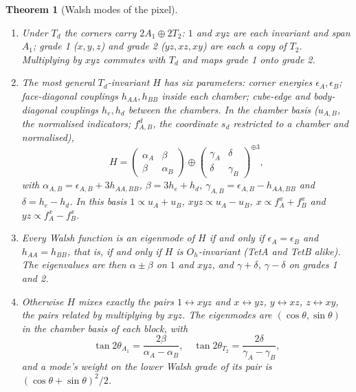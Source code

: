 \documentclass[twocolumn]{iopjournal}
\newtheorem{theorem}{Theorem}
\theoremstyle{definition}
\theoremstyle{remark}
\begin{document}
\begin{theorem}[Walsh modes of the pixel]
\label{thm:pairing}
\begin{enumerate}
\item[(i)] Under $T_d$ the corners carry $2A_1 \oplus 2T_2$: $1$ and
  $xyz$ are each invariant and span $A_1$; grade 1 ($x, y, z$) and grade 2
  ($yz, xz, xy$) are each a copy of $T_2$. Multiplying by $xyz$ commutes
  with $T_d$ and maps grade 1 onto grade 2.
\item[(ii)] The most general $T_d$-invariant $H$ has six parameters:
  corner energies $\epsilon_A, \epsilon_B$; face-diagonal couplings
  $h_{AA}, h_{BB}$ inside each chamber; cube-edge and body-diagonal
  couplings $h_e, h_d$ between the chambers. In the chamber basis
  ($u_{A,B}$, the normalised indicators; $f^d_{A,B}$, the coordinate $s_d$
  restricted to a chamber and normalised),
  \begin{equation}
  H = \begin{pmatrix}\alpha_A & \beta\\ \beta & \alpha_B\end{pmatrix}
  \oplus
  \begin{pmatrix}\gamma_A & \delta\\ \delta & \gamma_B\end{pmatrix}^{\oplus 3},
  \label{eq:blocks}
  \end{equation}
  with $\alpha_{A,B} = \epsilon_{A,B} + 3h_{AA,BB}$, $\beta = 3h_e + h_d$,
  $\gamma_{A,B} = \epsilon_{A,B} - h_{AA,BB}$ and $\delta = h_e - h_d$.
  In this basis $1 \propto u_A + u_B$, $xyz \propto u_A - u_B$,
  $x \propto f^x_A + f^x_B$ and $yz \propto f^x_A - f^x_B$.
\item[(iii)] Every Walsh function is an eigenmode of $H$ if and only if
  $\epsilon_A = \epsilon_B$ and $h_{AA} = h_{BB}$, that is, if and only
  if $H$ is $O_h$-invariant (TetA and TetB alike). The eigenvalues are
  then $\alpha \pm \beta$ on $1$ and $xyz$, and $\gamma + \delta$,
  $\gamma - \delta$ on grades 1 and 2.
\item[(iv)] Otherwise $H$ mixes exactly the pairs $1 \leftrightarrow
  xyz$ and $x \leftrightarrow yz$, $y \leftrightarrow xz$, $z
  \leftrightarrow xy$, the pairs related by multiplying by $xyz$. The
  eigenmodes are $(\cos\theta, \sin\theta)$ in the chamber basis of each
  block, with
  \begin{equation}
  \tan 2\theta_{A_1} = \frac{2\beta}{\alpha_A - \alpha_B},\quad
  \tan 2\theta_{T_2} = \frac{2\delta}{\gamma_A - \gamma_B},
  \label{eq:mixing}
  \end{equation}
  and a mode's weight on the lower Walsh grade of its pair is
  $(\cos\theta + \sin\theta)^2/2$.
\end{enumerate}
\end{theorem}
\end{document}
